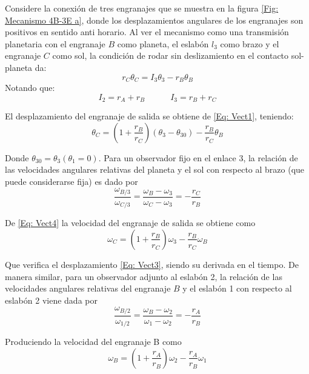 \documentclass[12pt, final]{extarticle}
\begin{document}
Considere la conexión de tres engranajes que se muestra en la figura \ref{Fig:
Mecanismo 4B-3E a}, donde los desplazamientos angulares de los engranajes son
positivos en sentido anti horario. Al ver el mecanismo como una transmisión
planetaria con el engranaje $B$ como planeta, el eslabón $l_3$ como brazo y el
engranaje $C$ como sol, la condición de rodar sin deslizamiento en el contacto
sol-planeta da:
\begin{equation}
   r_C\theta_C=I_3\theta_3-r_B\theta_B
   \label{Eq: Vect1}
\end{equation}
Notando que:
\begin{equation}
   I_2=r_A+r_B  \quad\quad\quad I_3=r_B+r_C
   \label{Eq: Vect2}
\end{equation}

El desplazamiento del engranaje de salida se obtiene de \eqref{Eq: Vect1},
teniendo:
\begin{equation}
   \theta_C=(1+\frac{r_B}{r_C})(\theta_3-\theta_{30})-\frac{r_B}{r_C}\theta_B
   \label{Eq: Vect3}
\end{equation}

Donde $\theta_{30}=\theta_3(\theta_1=0)$. Para un observador fijo en el enlace
3, la relación de las velocidades angulares relativas del planeta y el sol con
respecto al brazo (que puede considerarse fija) es dado por
\begin{equation}
   \frac{\omega_{B/3}}{\omega_{C/3}}=\frac{\omega_B-\omega_3}{\omega_C-\omega_3}=-\frac{r_C}{r_B}
    \label{Eq: Vect4}
\end{equation}

De \eqref{Eq: Vect4} la velocidad del engranaje de salida se obtiene como
\begin{equation}
   \omega_C=(1+\frac{r_B}{r_C})\omega_3-\frac{r_B}{r_C}\omega_B
   \label{Eq: Vect5}
\end{equation}

Que verifica el desplazamiento \eqref{Eq: Vect3}, siendo su derivada en el tiempo.
De manera similar, para un observador adjunto al eslabón 2, la relación de las
velocidades angulares relativas del engranaje $B$ y el eslabón 1 con respecto al
eslabón 2 viene dada por
\begin{equation}
   \frac{\omega_{B/2}}{\omega_{1/2}}=\frac{\omega_B-\omega_2}{\omega_1-\omega_2}=-\frac{r_A}{r_B}
\end{equation}

Produciendo la velocidad del engranaje B como
\begin{equation}
   \omega_B=(1+\frac{r_A}{r_B})\omega_2-\frac{r_A}{r_B}\omega_1
   \label{Eq: Vect7}
\end{equation}
\end{document}
